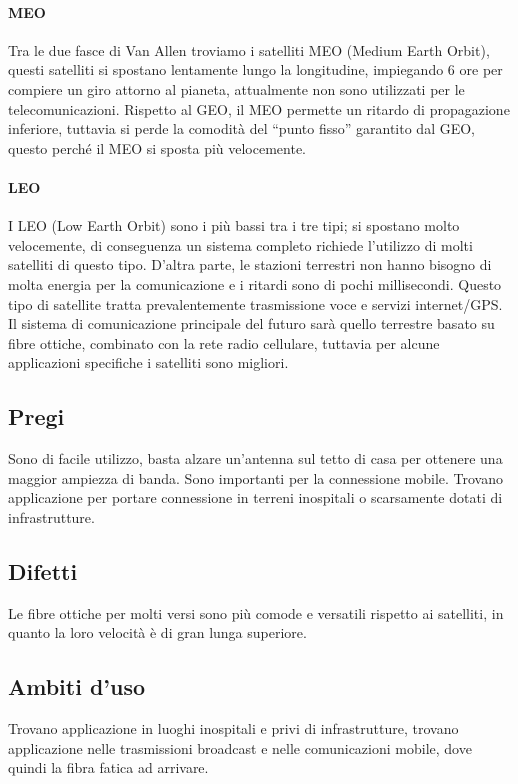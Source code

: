 \paragraph{MEO}
Tra le due fasce di Van Allen troviamo i satelliti MEO (Medium Earth Orbit), questi satelliti si spostano lentamente lungo la longitudine, impiegando 6 ore per compiere un giro attorno al pianeta, attualmente non sono utilizzati per le telecomunicazioni. Rispetto al GEO, il MEO permette un ritardo di propagazione inferiore, tuttavia si perde la comodità del “punto fisso” garantito dal GEO, questo perché il MEO si sposta più velocemente.
\paragraph{LEO}
I LEO (Low Earth Orbit) sono i più bassi tra i tre tipi; si spostano molto velocemente, di conseguenza un sistema completo richiede l’utilizzo di molti satelliti di questo tipo. D’altra parte, le stazioni terrestri non hanno bisogno di molta energia per la comunicazione e i ritardi sono di pochi millisecondi.
Questo tipo di satellite tratta prevalentemente trasmissione voce e servizi internet/GPS. \\

Il sistema di comunicazione principale del futuro sarà quello terrestre basato su fibre ottiche, combinato con la rete radio cellulare, tuttavia per alcune applicazioni specifiche i satelliti sono migliori.

\subsection{Pregi}
Sono di facile utilizzo, basta alzare un'antenna sul tetto di casa per ottenere una maggior ampiezza di banda.
Sono importanti per la connessione mobile.
Trovano applicazione per portare connessione in terreni inospitali o scarsamente dotati di infrastrutture.

\subsection{Difetti}
Le fibre ottiche per molti versi sono più comode e versatili rispetto ai satelliti, in quanto la loro velocità è di gran lunga superiore.
\subsection{Ambiti d'uso}
Trovano applicazione in luoghi inospitali e privi di infrastrutture, trovano applicazione nelle trasmissioni broadcast e nelle comunicazioni mobile, dove quindi la fibra fatica ad arrivare.

